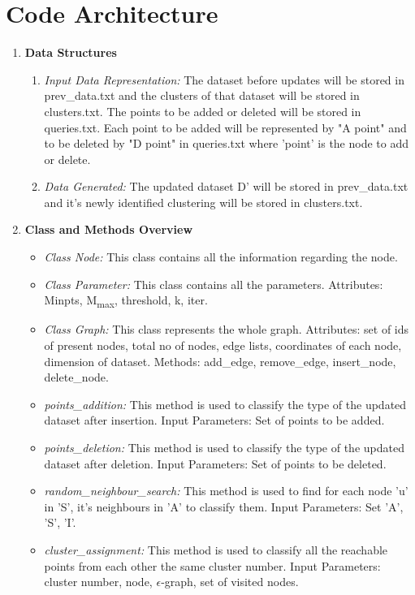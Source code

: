 \documentclass[acmsmall]{acmart}
\begin{document}
\section*{Code Architecture}
\begin{enumerate}
    \item \textbf{Data Structures}
    \begin{enumerate}
        \item \textit{Input Data Representation: } The dataset before updates will be stored in prev\_data.txt and the clusters of that dataset will be stored in clusters.txt. The points to be added or deleted will be stored in queries.txt. Each point to be added will be represented by "A point" and to be deleted by "D point" in queries.txt where 'point' is the node to add or delete.
        \item \textit{Data Generated: } The updated dataset D' will be stored in prev\_data.txt and it's newly identified clustering will be stored in clusters.txt.
    \end{enumerate}
    \vspace{3pt}
    \item \textbf{Class and Methods Overview}
    \begin{itemize}
        \item \textit{Class Node: } This class contains all the information regarding the node.
        \item \textit{Class Parameter:} This class contains all the parameters. \newline Attributes: Minpts, M\textsubscript{max}, threshold, k, iter.
        \item \textit{Class Graph: } This class represents the whole graph.
        Attributes: set of ids of present nodes, total no of nodes, edge lists, coordinates of each node, dimension of dataset. 
        Methods: add\_edge, remove\_edge, insert\_node, delete\_node.
        \item \textit{points\_addition: }This method is used to classify the type of the updated dataset after insertion. \newline
        Input Parameters: Set of points to be added.
        \item \textit{points\_deletion: }This method is used to classify the type of the updated dataset after deletion. \newline
        Input Parameters: Set of points to be deleted.
        \item \textit{random\_neighbour\_search: }This method is used to find for each node 'u' in 'S', it's neighbours in 'A' to classify them.
        Input Parameters: Set 'A', 'S', 'I'.
        \item \textit{cluster\_assignment: }This method is used to classify all the reachable points from each other the same cluster number.
        Input Parameters: cluster number, node, $\epsilon$-graph, set of visited nodes.
    \end{itemize}
\end{enumerate}
\end{document}
